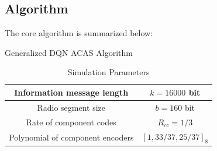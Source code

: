 \documentclass[journal, a4paper]{IEEEtran}
\makeatletter
\def\BState{\State\hskip-\ALG@thistlm}
\makeatother
\begin{document}
\subsection{Algorithm}
The core algorithm is summarized below:
\begin{algorithm}
\caption{Generalized DQN ACAS Algorithm}\label{euclid}
\end{algorithm}
    \begin{table}[!hbt]
        \begin{center}
        \caption{Simulation Parameters}
        \label{tab:simParameters}
        \begin{tabular}{|c|c|}
            \hline
            Information message length & $k=16000$ bit \\
            \hline
            Radio segment size & $b=160$ bit \\
            \hline
            Rate of component codes & $R_{cc}=1/3$\\
            \hline
            Polynomial of component encoders & $[1 , 33/37 , 25/37]_8$\\
            \hline
        \end{tabular}
        \end{center}
    \end{table}
\end{document}
